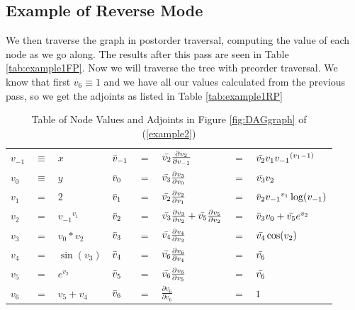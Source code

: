 \documentclass{article}
\begin{document}
\subsection{Example of Reverse Mode}


We then traverse the graph in postorder traversal, computing the value of each node as we go along. The results after this pass are seen in Table \ref{tab:example1FP}. Now we will traverse the tree with preorder traversal. We know that first $\dot{v_6} \equiv 1$ and we have all our values calculated from the previous pass, so we get the adjoints as listed in Table \ref{tab:example1RP}


\begin{table}[h!]
    \centering
    \begin{tabular}{|lcl|lclll|}
        \hline
        $v_{-1}$ & $\equiv$ & $x$ & $\Bar{v}_{-1}$ & $=$ & $\Bar{v_2}\frac{\partial{v_2}}{\partial{v_{-1}}}$ & $=$ & $\Bar{v_2}v_1 {v_{-1}}^{(v_{1}-1)}$\\
        $v_{0}$ & $\equiv$ & $y$ & $\Bar{v}_{0}$ & $=$ & $\Bar{v_3}\frac{\partial{v_3}}{\partial{v_0}}$ & $=$ & $\Bar{v_3}v_2$\\
        \hline
        $v_{1}$ & $=$ & $2$ & $\Bar{v}_{1}$ & $=$ & $\Bar{v_2}\frac{\partial{v_2}}{\partial{v_1}}$ & $=$ & $\Bar{v}_{2}{v_{-1}}^{v_{1}}\log(v_{-1})$\\
        $v_{2}$ & $=$ & ${v_{-1}}^{v_{1}}$ & $\Bar{v}_{2}$ & $=$ & $\Bar{v_3}\frac{\partial{v_3}}{\partial{v_2}} + \Bar{v_5}\frac{\partial{v_5}}{\partial{v_2}}$ & $=$ & $\Bar{v}_{3}v_0 + \Bar{v_5}e^{v_2}$\\
        $v_{3}$ & $=$ & ${v_{0}}*{v_{2}}$ & $\Bar{v}_{3}$ & $=$ & $\Bar{v_4}\frac{\partial{v_4}}{\partial{v_3}}$ & $=$ & $\Bar{v_4}\cos(v_2)$\\
        $v_{4}$ & $=$ & $\sin(v_3)$ & $\Bar{v}_{4}$ & $=$ & $\Bar{v_6}\frac{\partial{v_6}}{\partial{v_4}}$ & $=$ & $\Bar{v_6}$\\
        $v_{5}$ & $=$ & $e^{v_2}$ & $\Bar{v}_{5}$ & $=$ & $\Bar{v_6}\frac{\partial{v_6}}{\partial{v_5}}$ & $=$ & $\Bar{v_6}$\\
        \hline
        $v_{6}$ & $=$ & $v_5 + v_4$ & $\Bar{v}_{6}$ & $=$ & $\frac{\partial{v_6}}{\partial{v_6}}$ & $=$ & $1$\\
        \hline
    \end{tabular}
    \caption{Table of Node Values and Adjoints in Figure \ref{fig:DAGgraph} of (\ref{example2})}
    \label{tab:example1}
\end{table}
\end{document}
